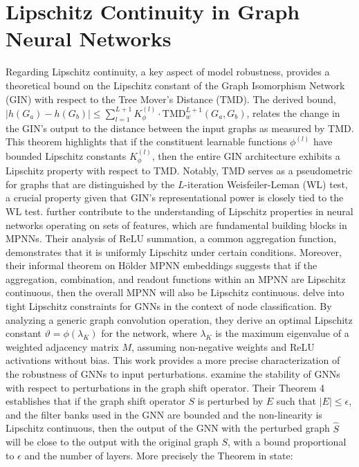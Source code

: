 \documentclass[11pt]{article}\usepackage{amsmath,amssymb,amsthm,bbm}
\newcommand{\1}{\mathbbm{1}}
\begin{document}
\section*{Lipschitz Continuity in Graph Neural Networks}

Regarding Lipschitz continuity, a key aspect of model robustness, \cite{chuang2022tree} provides a theoretical bound on the Lipschitz constant of the Graph Isomorphism Network (GIN) with respect to the Tree Mover’s Distance (TMD). The derived bound, $|h(G_a)-h(G_b)| \le \sum_{l=1}^{L+1} K^{(l)}_{\phi} \cdot \mathrm{TMD}_w^{L+1}(G_a,G_b)$, relates the change in the GIN's output to the distance between the input graphs as measured by TMD. This theorem highlights that if the constituent learnable functions $\phi^{(l)}$ have bounded Lipschitz constants $K^{(l)}_{\phi}$, then the entire GIN architecture exhibits a Lipschitz property with respect to TMD. Notably, TMD serves as a pseudometric for graphs that are distinguished by the $L$-iteration Weisfeiler-Leman (WL) test, a crucial property given that GIN's representational power is closely tied to the WL test. \cite{davidson2024h} further contribute to the understanding of Lipschitz properties in neural networks operating on sets of features, which are fundamental building blocks in MPNNs. Their analysis of ReLU summation, a common aggregation function, demonstrates that it is uniformly Lipschitz under certain conditions. Moreover, their informal theorem on Hölder MPNN embeddings suggests that if the aggregation, combination, and readout functions within an MPNN are Lipschitz continuous, then the overall MPNN will also be Lipschitz continuous. \cite{juvina2024training} delve into tight Lipschitz constraints for GNNs in the context of node classification. By analyzing a generic graph convolution operation, they derive an optimal Lipschitz constant $\vartheta = \phi(\lambda_K)$ for the network, where $\lambda_K$ is the maximum eigenvalue of a weighted adjacency matrix $M$, assuming non-negative weights and ReLU activations without bias. This work provides a more precise characterization of the robustness of GNNs to input perturbations. \cite{gama2020stability} examine the stability of GNNs with respect to perturbations in the graph shift operator. Their Theorem 4 establishes that if the graph shift operator $S$ is perturbed by $E$ such that $|E|\le\epsilon$, and the filter banks used in the GNN are bounded and the non-linearity is Lipschitz continuous, then the output of the GNN with the perturbed graph $\hat{S}$ will be close to the output with the original graph $S$, with a bound proportional to $\epsilon$ and the number of layers.
More precisely the Theorem in \cite{davidson2024h} state: 
\end{document}
